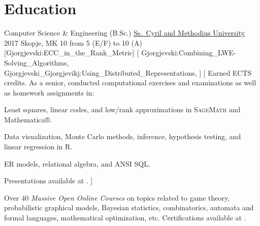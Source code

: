 \documentclass[%
version=last,%
fontsize=11pt,%
paper=A4,%
headinclude=false,%
footinclude=false,%
headlines=0,%
footlines=0,%
areasetadvanced,%
toc=bibnumbered,%
]{scrartcl}%
\begin{document}
\begin{minipage}[t]{.575\textwidth}
  \section{Education}%
  \label{sec:education}
  \EducationEntry%
  {Computer Science \& Engineering (B.Sc.)}%
  {\href{http://ukim.edu.mk/}{Ss.\ Cyril and Methodius University}}%
  {2017}%
  {Skopje, MK}%
  {10}%
  {from 5 (E/F) to 10 (A)}%
  [Gjorgjevski:ECC_in_the_Rank_Metric]%
  [%
  Gjorgjevski:Combining_LWE-Solving_Algorithms,%
  Gjorgjevski_Gjorgjevikj:Using_Distributed_Representations,%
  ]%
  [%
  Earned  ECTS credits.  As a senior, conducted computational
  exercises and examinations as well as homework assignments in:
  \begin{description}%
    [leftmargin=*,widest=Linear Algebra,font=\normalfont\itshape]
  \item[Linear Algebra] Least squares, linear codes, and low\-/rank
    approximations in \textsc{SageMath} and Mathematica®.
  \item[Statistics] Data visualization, Monte Carlo methods, inference,
    hypothesis testing, and linear regression in R.
  \item[Databases] ER models, relational algebra, and ANSI SQL\@.
  \end{description}
  Presentations available at .%
  ]

  \begin{tcolorbox}[size=fbox,fontlower=\small,colframe=black]
    Over \num{40} \emph{Massive Open Online Courses} on topics related to game
    theory, probabilistic graphical models, Bayesian statistics, combinatorics,
    automata and formal languages, mathematical optimization, etc.%
    \tcblower%
    Certifications available at
    .
  \end{tcolorbox}

  \printbibliography[type=thesis,title=Theses]%
  \printbibliography[nottype=thesis,title=Publications]
\end{minipage}%
\hfill%
\end{document}
